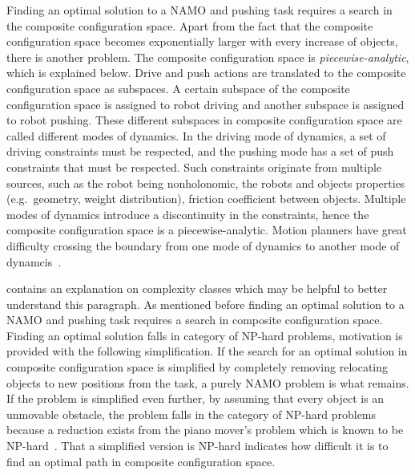 Finding an optimal solution to a \ac{NAMO} and pushing task requires a search in the composite configuration space. Apart from the fact that the composite configuration space becomes exponentially larger with every increase of objects, there is another problem.
The composite configuration space is \textit{piecewise-analytic}, which is explained below. Drive and push actions are translated to the composite configuration space as subspaces. A certain subspace of the composite configuration space is assigned to robot driving and another subspace is assigned to robot pushing. These different subspaces in composite configuration space are called different modes of dynamics. In the driving mode of dynamics, a set of driving constraints must be respected, and the pushing mode has a set of push constraints that must be respected. Such constraints originate from multiple sources, such as the robot being nonholonomic, the robots and objects properties (e.g.~geometry, weight distribution), friction coefficient between objects. Multiple modes of dynamics introduce a discontinuity in the constraints, hence the composite configuration space is a piecewise-analytic. Motion planners have great difficulty crossing the boundary from one mode of dynamics to another mode of dynamcis~\cite{vega-brown_asymptotically_2020}.\bs

 contains an explanation on complexity classes which may be helpful to better understand this paragraph. As mentioned before finding an optimal solution to a \ac{NAMO} and pushing task requires a search in composite configuration space. Finding an optimal solution falls in category of \ac{NP-hard} problems, motivation is provided with the following simplification. If the search for an optimal solution in composite configuration space is simplified by completely removing relocating objects to new positions from the task, a purely \ac{NAMO} problem is what remains. If the problem is simplified even further, by assuming that every object is an unmovable obstacle, the problem falls in the category of \ac{NP-hard} problems because a reduction exists from the piano mover's problem which is known to be \ac{NP-hard}~\cite{reif_motion_1985}. That a simplified version is \ac{NP-hard} indicates how difficult it is to find an optimal path in composite configuration space.\bs

